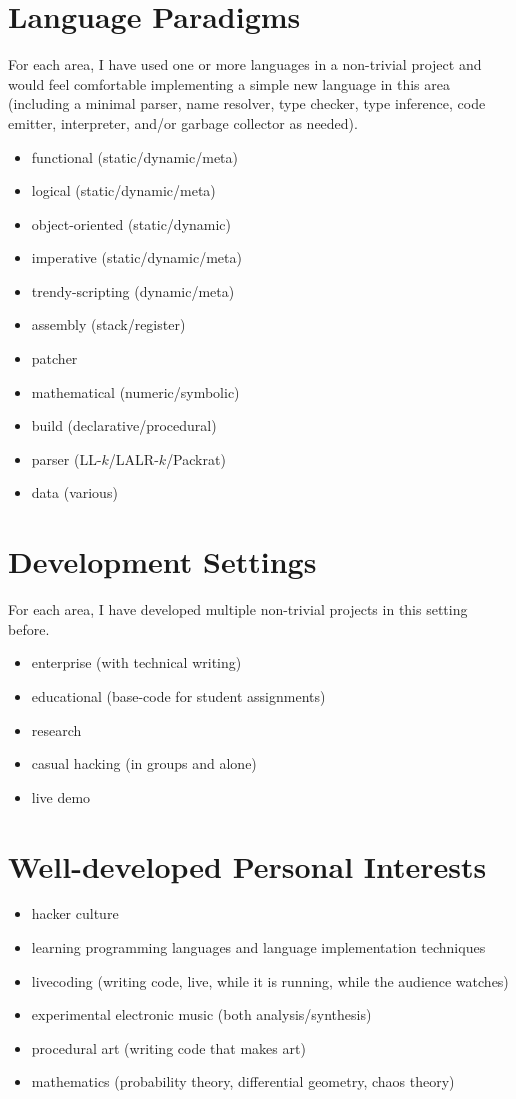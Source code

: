 \documentclass[12pt]{article}
\begin{document}
\section*{Language Paradigms}
For each area, I have used one or more languages in a non-trivial project and
would feel comfortable implementing a simple new language in this area
(including a minimal parser, name resolver, type checker, type inference, code
emitter, interpreter, and/or garbage collector as needed).

\begin{itemize}
  \item functional (static/dynamic/meta) 
  \item logical (static/dynamic/meta)
  \item object-oriented (static/dynamic)
  \item imperative (static/dynamic/meta)
  \item trendy-scripting (dynamic/meta)
  \item assembly (stack/register)
  \item patcher
  \item mathematical (numeric/symbolic)
  \item build (declarative/procedural)
  \item parser (LL-$k$/LALR-$k$/Packrat)
  \item data (various)
\end{itemize}

\section*{Development Settings}
For each area, I have developed multiple non-trivial projects in this setting before.
\begin{itemize}
  \item enterprise (with technical writing)
  \item educational (base-code for student assignments)
  \item research
  \item casual hacking (in groups and alone)
  \item live demo
\end{itemize}

\newpage
\section*{Well-developed Personal Interests}
\begin{itemize}
  \item hacker culture
  \item learning programming languages and language implementation techniques
  \item livecoding (writing code, live, while it is running, while the audience watches)
  \item experimental electronic music (both analysis/synthesis)
  \item procedural art (writing code that makes art)
  \item mathematics (probability theory, differential geometry, chaos theory)
\end{itemize}
\end{document}
